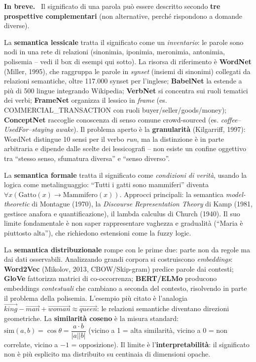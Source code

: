\documentclass[11pt,a4paper]{article}
\newcommand{\spiega}{\medskip\noindent\textbf{\textcolor{blue!45!black}{In breve.}}\ }
\begin{document}
\spiega
Il significato di una parola pu\`o essere descritto secondo \textbf{tre prospettive complementari} (non alternative, perch\'e rispondono a domande diverse).

La \textbf{semantica lessicale} tratta il significato come un \emph{inventario}: le parole sono nodi in una rete di relazioni (sinonimia, iponimia, meronimia, antonimia, polisemia -- vedi il box di esempi qui sotto). La risorsa di riferimento \`e \textbf{WordNet} (Miller, 1995), che raggruppa le parole in \emph{synset} (insiemi di sinonimi) collegati da relazioni semantiche, oltre 117.000 synset per l'inglese; \textbf{BabelNet} la estende a pi\`u di 500 lingue integrando Wikipedia; \textbf{VerbNet} si concentra sui ruoli tematici dei verbi; \textbf{FrameNet} organizza il lessico in \emph{frame} (es. COMMERCIAL\_TRANSACTION con ruoli buyer/seller/goods/money); \textbf{ConceptNet} raccoglie conoscenza di senso comune crowd-sourced (es. \emph{coffee--UsedFor--staying awake}). Il problema aperto \`e la \textbf{granularit\`a} (Kilgarriff, 1997): WordNet distingue 10 sensi per il verbo \emph{run}, ma la distinzione \`e in parte arbitraria e dipende dalle scelte dei lessicografi -- non esiste un confine oggettivo tra ``stesso senso, sfumatura diversa'' e ``senso diverso''.

La \textbf{semantica formale} tratta il significato come \emph{condizioni di verit\`a}, usando la logica come metalinguaggio: ``Tutti i gatti sono mammiferi'' diventa $\forall x(\text{Gatto}(x)\to\text{Mammifero}(x))$. Approcci principali: la semantica \emph{model-theoretic} di Montague (1970), la \emph{Discourse Representation Theory} di Kamp (1981, gestisce anafora e quantificazione), il lambda calculus di Church (1940). Il suo limite fondamentale \`e non saper rappresentare vaghezza e gradualit\`a (``Maria \`e piuttosto alta''), che richiedono estensioni come la fuzzy logic.

La \textbf{semantica distribuzionale} rompe con le prime due: parte non da regole ma dai dati osservabili. Analizzando grandi corpora si costruiscono \emph{embeddings}: \textbf{Word2Vec} (Mikolov, 2013, CBOW/Skip-gram) predice parole dai contesti; \textbf{GloVe} fattorizza matrici di co-occorrenza; \textbf{BERT/ELMo} producono embeddings \emph{contestuali} che cambiano a seconda del contesto, risolvendo in parte il problema della polisemia. L'esempio pi\`u citato \`e l'analogia $\vec{king}-\vec{man}+\vec{woman}\approx\vec{queen}$: le relazioni semantiche diventano direzioni geometriche. La \textbf{similarit\`a coseno} \`e la misura standard: $\mathrm{sim}(a,b)=\cos\theta=\dfrac{a\cdot b}{|a||b|}$ (vicino a 1 = alta similarit\`a, vicino a 0 = non correlate, vicino a $-1$ = opposizione). Il limite \`e l'\textbf{interpretabilit\`a}: il significato non \`e pi\`u esplicito ma distribuito su centinaia di dimensioni opache.
\end{document}
